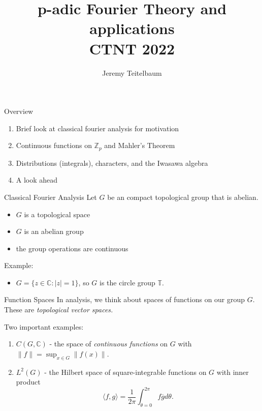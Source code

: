 \documentclass[
  ignorenonframetext,
]{beamer}
\title{p-adic Fourier Theory and applications\\
CTNT 2022}
\author{Jeremy Teitelbaum}
\date{}
\providecommand{\tightlist}{%
  \setlength{\itemsep}{0pt}\setlength{\parskip}{0pt}}
\begin{document}
\frame{\titlepage}

\begin{frame}{Overview}
\protect\hypertarget{overview}{}
\begin{enumerate}
\tightlist
\item
  Brief look at classical fourier analysis for motivation
\item
  Continuous functions on \(\mathbb{Z}_p\) and Mahler's Theorem
\item
  Distributions (integrals), characters, and the Iwasawa algebra
\item
  A look ahead
\end{enumerate}
\end{frame}

\begin{frame}{Classical Fourier Analysis}
\protect\hypertarget{classical-fourier-analysis}{}
Let \(G\) be an compact topological group that is abelian.

\begin{itemize}
\tightlist
\item
  \(G\) is a topological space
\item
  \(G\) is an abelian group
\item
  the group operations are continuous
\end{itemize}

Example:

\begin{itemize}
\tightlist
\item
  \(G=\{z\in\mathbb{C}: |z|=1\}\), so \(G\) is the circle group
  \(\mathbb{T}\).
\end{itemize}
\end{frame}

\begin{frame}{Function Spaces}
\protect\hypertarget{function-spaces}{}
In analysis, we think about spaces of functions on our group \(G\).
These are \emph{topological vector spaces.}

Two important examples:

\begin{enumerate}
\tightlist
\item
  \(C(G,\mathbb{C})\) - the space of \emph{continuous functions} on
  \(G\) with \(\|f\|=\sup_{x\in G} \|f(x)\|\).
\item
  \(L^{2}(G)\) - the Hilbert space of square-integrable functions on
  \(G\) with inner product \[
  \langle f,g\rangle = \frac{1}{2\pi}\int_{\theta=0}^{2\pi} f\overline{g}d\theta.
  \]
\end{enumerate}
\end{frame}
\end{document}

